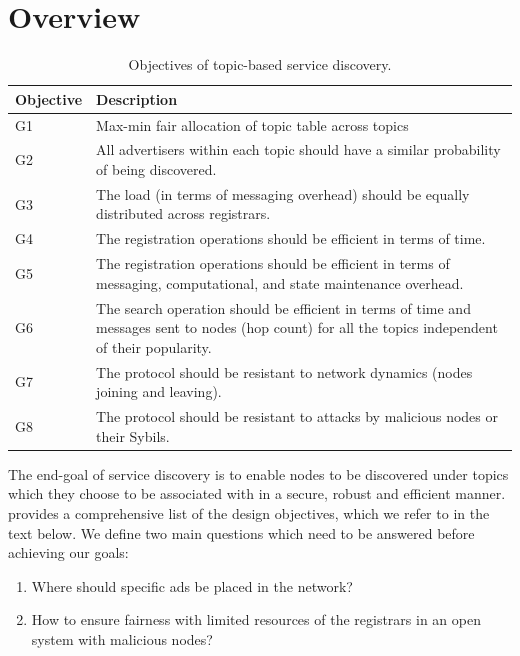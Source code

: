 \section{Overview}
\label{sec:overview}

\begin{table} 
\caption{Objectives of topic-based service discovery.}
\label{tab:objectives}
\renewcommand{\arraystretch}{1.5}
\renewcommand{\tabcolsep}{0.5em}
\centering
\scriptsize{
\begin{tabular} {p{1cm}p{5cm}}
\toprule
\textbf{Objective} & \textbf{Description} \\
\hline
G1 & Max-min fair allocation of topic table across topics \\
\hline
G2 & All advertisers within each topic should have a similar probability of being discovered. \\
\hline
G3 & The load (in terms of messaging overhead) should be equally distributed across registrars. \\
\hline
G4 & The registration operations should be efficient in terms of time. \\
\hline
G5 & The registration operations should be efficient in terms of messaging, computational, and state maintenance overhead. \\
\hline 
G6 & The search operation should be efficient in terms of time and messages sent to nodes (hop count) for all the topics independent of their popularity. \\
\hline
G7 & The protocol should be resistant to network dynamics (nodes joining and leaving). \\
\hline 
G8 & The protocol should be resistant to attacks by malicious nodes or their Sybils. \\
\hline
\end{tabular}
}
\vspace{-0.2in}
\end{table}


The end-goal of service discovery is to enable nodes to be discovered under topics which they choose to be associated with in a secure, robust and efficient manner.  provides a comprehensive list of the design objectives, which we refer to in the text below. We define two main questions which need to be answered before achieving our goals:
\begin{enumerate}
    \item Where should specific ads be placed in the network?
    \item How to ensure fairness with limited resources of the registrars in an open system with malicious nodes?
\end{enumerate}

